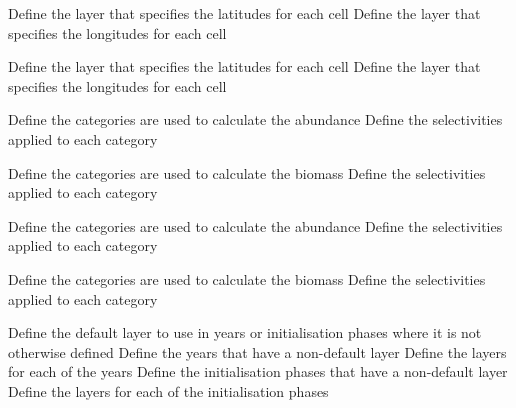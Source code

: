 \par\textbf{}\par
\par\textbf{}\par
{} {Define the layer that specifies the latitudes for each cell}
 {Define the layer that specifies the longitudes for each cell}
\par\textbf{}\par
\par\textbf{}\par
{} {Define the layer that specifies the latitudes for each cell}
 {Define the layer that specifies the longitudes for each cell}
\par\textbf{}\par
{} {Define the categories are used to calculate the abundance}
 {Define the selectivities applied to each category}
\par\textbf{}\par
{} {Define the categories are used to calculate the biomass}
 {Define the selectivities applied to each category}
\par\textbf{}\par
{} {Define the categories are used to calculate the abundance}
 {Define the selectivities applied to each category}
\par\textbf{}\par
{} {Define the categories are used to calculate the biomass}
 {Define the selectivities applied to each category}
\par\textbf{}\par
{} {Define the default layer to use in years or initialisation phases where it is not otherwise defined}
 {Define the years that have a non-default layer}
 {Define the layers for each of the years}
 {Define the initialisation phases that have a non-default layer}
 {Define the layers for each of the initialisation phases}
